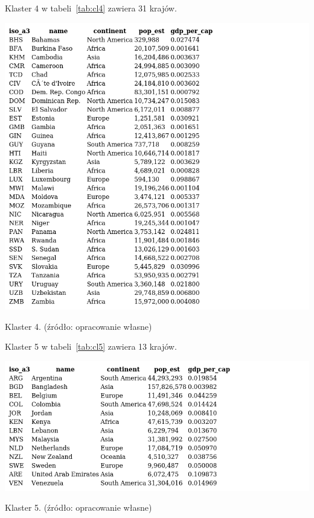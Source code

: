 \documentclass[11pt]{report}
\begin{document}
    Klaster 4 w tabeli~\ref{tab:cl4} zawiera 31 krajów.
    \begin{table}[!htp]
        \centering
        \includegraphics[width=\linewidth]{tables/CLUST/clust4kmeans.png}
        \caption{Klaster 4. (źródło: opracowanie własne)}
        \label{tab:cl4}
    \end{table}

    Klaster 5 w tabeli~\ref{tab:cl5} zawiera 13 krajów.
    \begin{table}[!htp]
        \centering
        \includegraphics[width=\linewidth]{tables/CLUST/clust5kmeans.png}
        \caption{Klaster 5. (źródło: opracowanie własne)}
        \label{tab:cl5}
    \end{table}
\end{document}
